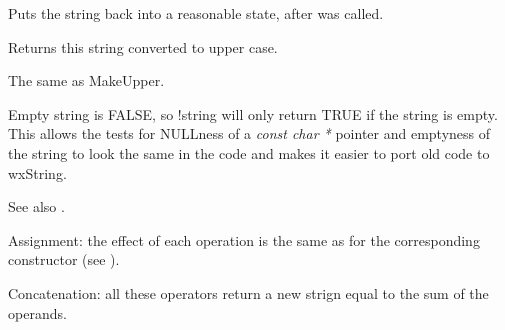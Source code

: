 Puts the string back into a reasonable state, after
\rtfsp{} was called.

\label{wxstringupper}


Returns this string converted to upper case.

\label{wxstringuppercase}


The same as MakeUpper.

\label{wxstringoperatornot}


Empty string is FALSE, so !string will only return TRUE if the string is empty.
This allows the tests for NULLness of a {\it const char *} pointer and emptyness
of the string to look the same in the code and makes it easier to port old code
to wxString.

See also .

\label{wxstringoperatorassign}






Assignment: the effect of each operation is the same as for the corresponding
constructor (see ).

\label{wxstringoperatorplus}

Concatenation: all these operators return a new strign equal to the sum of the
operands.




